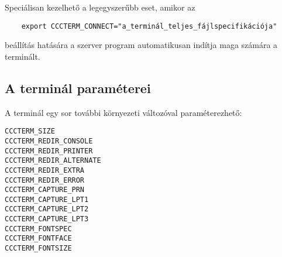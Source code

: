 Speciálisan kezelhető a legegyszerűbb eset, amikor az
\begin{verbatim}
    export CCCTERM_CONNECT="a_terminál_teljes_fájlspecifikációja"
\end{verbatim} beállítás hatására a szerver program automatikusan 
indítja maga számára a terminált.

\subsection{A terminál paraméterei}

A terminál egy sor további környezeti változóval paraméterezhető:
\begin{description}
\item[{\tt CCCTERM\_SIZE}]
\item[{\tt CCCTERM\_REDIR\_CONSOLE}]
\item[{\tt CCCTERM\_REDIR\_PRINTER}]
\item[{\tt CCCTERM\_REDIR\_ALTERNATE}]
\item[{\tt CCCTERM\_REDIR\_EXTRA}]
\item[{\tt CCCTERM\_REDIR\_ERROR}]
\item[{\tt CCCTERM\_CAPTURE\_PRN}]
\item[{\tt CCCTERM\_CAPTURE\_LPT1}]
\item[{\tt CCCTERM\_CAPTURE\_LPT2}]
\item[{\tt CCCTERM\_CAPTURE\_LPT3}]
\item[{\tt CCCTERM\_FONTSPEC}] %
\item[{\tt CCCTERM\_FONTFACE}] %
\item[{\tt CCCTERM\_FONTSIZE}] %
\end{description}









